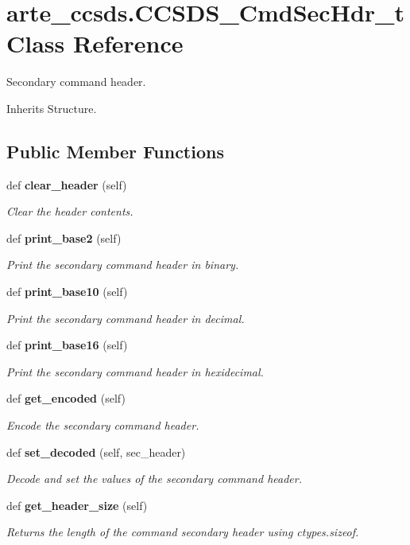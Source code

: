 \section{arte\+\_\+ccsds.\+C\+C\+S\+D\+S\+\_\+\+Cmd\+Sec\+Hdr\+\_\+t Class Reference}
\label{classarte__ccsds_1_1_c_c_s_d_s___cmd_sec_hdr__t}


Secondary command header.  




Inherits Structure.

\subsection*{Public Member Functions}
\begin{DoxyCompactItemize}
\item 
def {\bf clear\+\_\+header} (self)
\begin{DoxyCompactList}\small\item\em Clear the header contents. \end{DoxyCompactList}\item 
def {\bf print\+\_\+base2} (self)
\begin{DoxyCompactList}\small\item\em Print the secondary command header in binary. \end{DoxyCompactList}\item 
def {\bf print\+\_\+base10} (self)
\begin{DoxyCompactList}\small\item\em Print the secondary command header in decimal. \end{DoxyCompactList}\item 
def {\bf print\+\_\+base16} (self)
\begin{DoxyCompactList}\small\item\em Print the secondary command header in hexidecimal. \end{DoxyCompactList}\item 
def {\bf get\+\_\+encoded} (self)
\begin{DoxyCompactList}\small\item\em Encode the secondary command header. \end{DoxyCompactList}\item 
def {\bf set\+\_\+decoded} (self, sec\+\_\+header)
\begin{DoxyCompactList}\small\item\em Decode and set the values of the secondary command header. \end{DoxyCompactList}\item 
def {\bf get\+\_\+header\+\_\+size} (self)
\begin{DoxyCompactList}\small\item\em Returns the length of the command secondary header using ctypes.\+sizeof. \end{DoxyCompactList}\end{DoxyCompactItemize}


